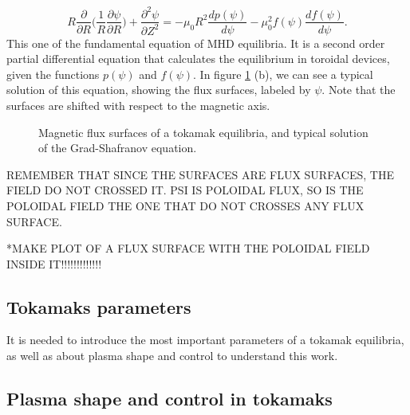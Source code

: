 \documentclass[a4paper,12pt,oneside]{book}
\newcommand{\p}{\partial}
\begin{document}
\begin{equation} \label{ec Grad Shaf}
R \dfrac{\p }{\p R} \Big( \dfrac{1}{R} \dfrac{\p \psi}{\p R} \Big) +\dfrac{\p^2 \psi}{\p Z^2}=-\mu_0 R^2 \dfrac{d p(\psi)}{d \psi} -\mu_0^2 f( \psi) \dfrac{d f(\psi)}{d \psi}.
\end{equation}
%
This one of the fundamental equation of MHD equilibria. It is a second order partial differential equation that calculates the equilibrium in toroidal devices, given the functions $p(\psi)$ and $f(\psi)$. In figure \ref{nested and sol grad} (b), we can see a typical solution of this equation, showing the flux surfaces, labeled by $\psi$. Note that the surfaces are shifted with respect to the magnetic axis.

\begin{figure}
\centering
{}
\hspace{5cm}

\caption{Magnetic flux surfaces of a tokamak equilibria, and typical solution of the Grad-Shafranov equation.}
\label{nested and sol grad}
\end{figure}

REMEMBER THAT SINCE THE SURFACES ARE FLUX SURFACES, THE FIELD DO NOT CROSSED IT. PSI IS POLOIDAL FLUX, SO IS THE POLOIDAL FIELD THE ONE THAT DO NOT CROSSES ANY FLUX SURFACE.

*MAKE PLOT OF A FLUX SURFACE WITH THE POLOIDAL FIELD INSIDE IT!!!!!!!!!!!!!



\subsection{Tokamaks parameters}
\label{sec Parameters}
It is needed to introduce the most important parameters of a tokamak equilibria, as well as about plasma shape and control to understand this work.

\subsection{Plasma shape and control in tokamaks}
\label{section_shape}
\end{document}
